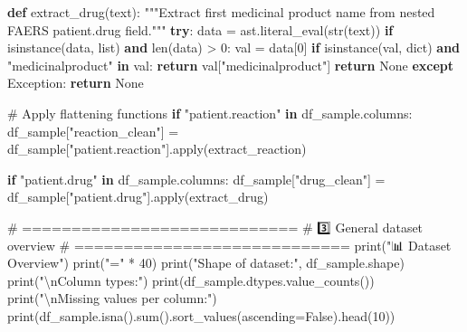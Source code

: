 \documentclass[
  letterpaper,
  DIV=11,
  numbers=noendperiod]{scrartcl}
\newenvironment{Shaded}{\begin{snugshade}}{\end{snugshade}}
\newcommand{\BuiltInTok}[1]{\textcolor[rgb]{0.00,0.23,0.31}{#1}}
\newcommand{\CharTok}[1]{\textcolor[rgb]{0.13,0.47,0.30}{#1}}
\newcommand{\CommentTok}[1]{\textcolor[rgb]{0.37,0.37,0.37}{#1}}
\newcommand{\ControlFlowTok}[1]{\textcolor[rgb]{0.00,0.23,0.31}{\textbf{#1}}}
\newcommand{\DecValTok}[1]{\textcolor[rgb]{0.68,0.00,0.00}{#1}}
\newcommand{\KeywordTok}[1]{\textcolor[rgb]{0.00,0.23,0.31}{\textbf{#1}}}
\newcommand{\NormalTok}[1]{\textcolor[rgb]{0.00,0.23,0.31}{#1}}
\newcommand{\OperatorTok}[1]{\textcolor[rgb]{0.37,0.37,0.37}{#1}}
\newcommand{\PreprocessorTok}[1]{\textcolor[rgb]{0.68,0.00,0.00}{#1}}
\newcommand{\StringTok}[1]{\textcolor[rgb]{0.13,0.47,0.30}{#1}}
\newcommand{\VariableTok}[1]{\textcolor[rgb]{0.07,0.07,0.07}{#1}}
\begin{document}
\begin{Shaded}
\begin{Highlighting}[]
\KeywordTok{def}\NormalTok{ extract\_drug(text):}
    \CommentTok{"""Extract first medicinal product name from nested FAERS \textquotesingle{}patient.drug\textquotesingle{} field."""}
    \ControlFlowTok{try}\NormalTok{:}
\NormalTok{        data }\OperatorTok{=}\NormalTok{ ast.literal\_eval(}\BuiltInTok{str}\NormalTok{(text))}
        \ControlFlowTok{if} \BuiltInTok{isinstance}\NormalTok{(data, }\BuiltInTok{list}\NormalTok{) }\KeywordTok{and} \BuiltInTok{len}\NormalTok{(data) }\OperatorTok{\textgreater{}} \DecValTok{0}\NormalTok{:}
\NormalTok{            val }\OperatorTok{=}\NormalTok{ data[}\DecValTok{0}\NormalTok{]}
            \ControlFlowTok{if} \BuiltInTok{isinstance}\NormalTok{(val, }\BuiltInTok{dict}\NormalTok{) }\KeywordTok{and} \StringTok{"medicinalproduct"} \KeywordTok{in}\NormalTok{ val:}
                \ControlFlowTok{return}\NormalTok{ val[}\StringTok{"medicinalproduct"}\NormalTok{]}
        \ControlFlowTok{return} \VariableTok{None}
    \ControlFlowTok{except} \PreprocessorTok{Exception}\NormalTok{:}
        \ControlFlowTok{return} \VariableTok{None}


\CommentTok{\# Apply flattening functions}
\ControlFlowTok{if} \StringTok{"patient.reaction"} \KeywordTok{in}\NormalTok{ df\_sample.columns:}
\NormalTok{    df\_sample[}\StringTok{"reaction\_clean"}\NormalTok{] }\OperatorTok{=}\NormalTok{ df\_sample[}\StringTok{"patient.reaction"}\NormalTok{].}\BuiltInTok{apply}\NormalTok{(extract\_reaction)}

\ControlFlowTok{if} \StringTok{"patient.drug"} \KeywordTok{in}\NormalTok{ df\_sample.columns:}
\NormalTok{    df\_sample[}\StringTok{"drug\_clean"}\NormalTok{] }\OperatorTok{=}\NormalTok{ df\_sample[}\StringTok{"patient.drug"}\NormalTok{].}\BuiltInTok{apply}\NormalTok{(extract\_drug)}

\CommentTok{\# ============================}
\CommentTok{\# 3️⃣ General dataset overview}
\CommentTok{\# ============================}
\BuiltInTok{print}\NormalTok{(}\StringTok{"📊 Dataset Overview"}\NormalTok{)}
\BuiltInTok{print}\NormalTok{(}\StringTok{"="} \OperatorTok{*} \DecValTok{40}\NormalTok{)}
\BuiltInTok{print}\NormalTok{(}\StringTok{"Shape of dataset:"}\NormalTok{, df\_sample.shape)}
\BuiltInTok{print}\NormalTok{(}\StringTok{"}\CharTok{\textbackslash{}n}\StringTok{Column types:"}\NormalTok{)}
\BuiltInTok{print}\NormalTok{(df\_sample.dtypes.value\_counts())}
\BuiltInTok{print}\NormalTok{(}\StringTok{"}\CharTok{\textbackslash{}n}\StringTok{Missing values per column:"}\NormalTok{)}
\BuiltInTok{print}\NormalTok{(df\_sample.isna().}\BuiltInTok{sum}\NormalTok{().sort\_values(ascending}\OperatorTok{=}\VariableTok{False}\NormalTok{).head(}\DecValTok{10}\NormalTok{))}


\end{Highlighting}
\end{Shaded}
\end{document}
